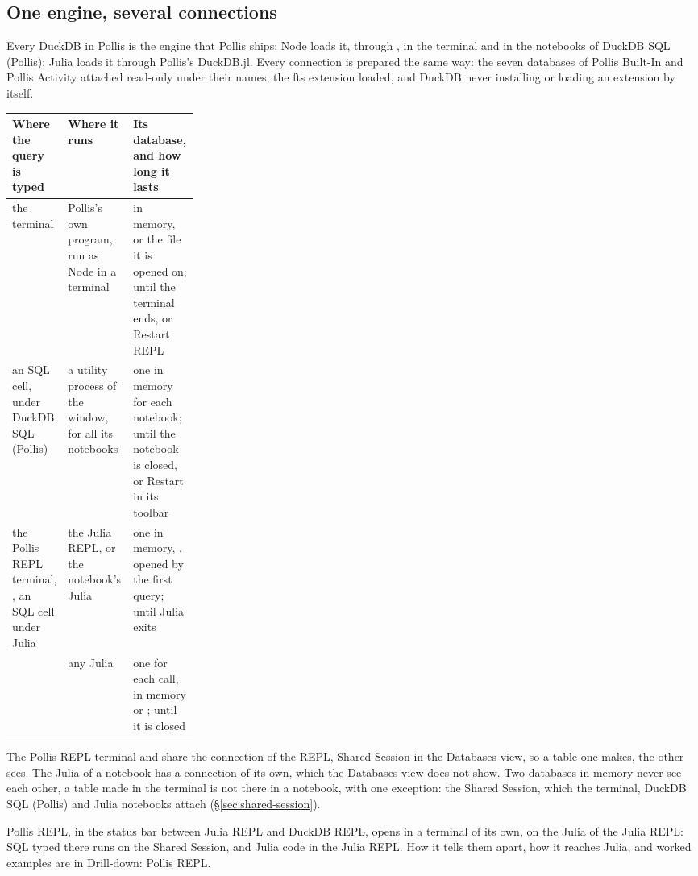 \subsection{One engine, several connections}
Every DuckDB in Pollis is the engine that Pollis ships: Node loads it, through , in the
 terminal and in the notebooks of DuckDB SQL (Pollis); Julia loads it through Pollis's DuckDB.jl. Every
connection is prepared the same way: the seven databases of Pollis Built-In and Pollis Activity attached read-only
under their names, the fts extension loaded, and DuckDB never installing or loading an extension by itself.

\begin{center}\small
\renewcommand{\arraystretch}{1.25}
\begin{tabularx}{\linewidth}{@{}p{0.27\linewidth}LL@{}}
\toprule
\textbf{Where the query is typed} & \textbf{Where it runs} & \textbf{Its database, and how long it lasts}\\
\midrule
the  terminal & Pollis's own program, run as Node in a terminal & in memory, or the file it is opened
  on; until the terminal ends, or Restart REPL\\
an SQL cell, under DuckDB SQL (Pollis) & a utility process of the window, for all its notebooks & one in memory for
  each notebook; until the notebook is closed, or Restart in its toolbar\\
the Pollis REPL terminal, , an SQL cell under Julia & the Julia REPL, or the notebook's Julia & one in
  memory, , opened by the first query; until Julia exits\\
 & any Julia & one for each call, in memory or ; until it is closed\\
\bottomrule
\end{tabularx}
\end{center}
The Pollis REPL terminal and  share the connection of the REPL, Shared Session in the Databases view, so a
table one makes, the other sees. The Julia of a notebook has a connection of its own, which the Databases view does not
show. Two databases in memory never see each other, a table made in the  terminal is not there in a
notebook, with one exception: the Shared Session, which the  terminal, DuckDB SQL (Pollis) and Julia
notebooks attach (\S\ref{sec:shared-session}).

Pollis REPL, in the status bar between Julia REPL and DuckDB REPL, opens  in a terminal of its own, on
the Julia of the Julia REPL: SQL typed there runs on the Shared Session, and Julia code in the Julia REPL. How it tells
them apart, how it reaches Julia, and worked examples are in Drill-down: Pollis REPL.

